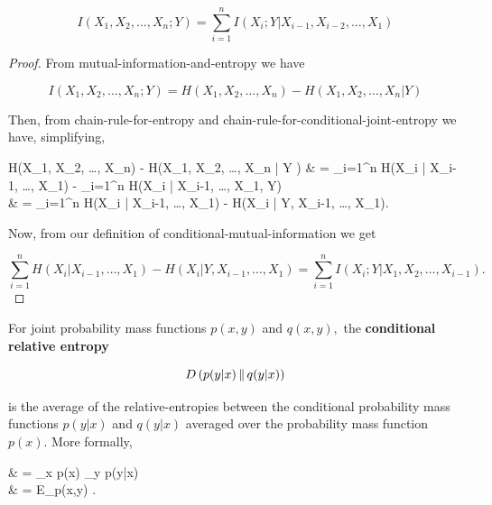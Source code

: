 \documentclass{article}
\begin{document}
\begin{theorem}

\[ I(X_1, X_2, \dots, X_n; Y) = \sum_{i=1}^n I(X_i; Y|X_{i-1},X_{i-2}, \dots, X_1)  \]

\end{theorem}
\begin{proof}


From \@{mutual-information-and-entropy} we have

\[ I(X_1, X_2, \dots, X_n; Y) = H(X_1, X_2, \dots, X_n) - H(X_1, X_2, \dots, X_n | Y ) \]

Then, from \@{chain-rule-for-entropy} and \@{chain-rule-for-conditional-joint-entropy}  we have, simplifying,

\bal
	H(X_1, X_2, \dots, X_n) - H(X_1, X_2, \dots, X_n | Y ) & = \sum_{i=1}^n H(X_i | X_{i-1}, \dots, X_1) - \sum_{i=1}^n H(X_i | X_{i-1}, \dots, X_1, Y) \\
	& = \sum_{i=1}^n H(X_i | X_{i-1}, \dots, X_1) -  H(X_i | Y, X_{i-1}, \dots, X_1).
\eal

	Now, from our definition of \@{conditional-mutual-information} we get

	\[ \sum_{i=1}^n H(X_i | X_{i-1}, \dots, X_1) -  H(X_i | Y, X_{i-1}, \dots, X_1) = \sum_{i=1}^n I(X_i; Y|X_1, X_2, \dots, X_{i-1}). \] 
\end{proof}

\begin{definition}
	For \@{joint probability mass functions} $p(x,y)$ and $q(x,y),$ the \textbf{conditional relative entropy}

	\[ D\left( p(y|x) \,\middle\|\, q(y|x) \right) \]

	is the \@{average} of the \@{relative-entropies} between the \@{conditional probability mass functions} $p(y|x)$ and $q(y|x)$ averaged over the \@{probability mass function} $p(x).$ More formally,

\bal
	 & = \sum_{x \in {}} p(x) \sum_{y \in {}} p(y|x)  \\
	                    & = E_{p(x,y)} .
\eal

\end{definition}
\end{document}
